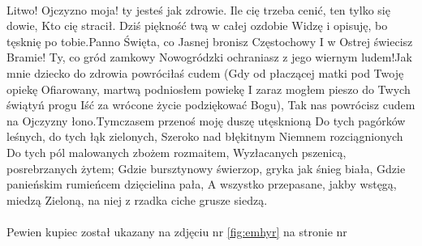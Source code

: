 \paragraph{}
Litwo! Ojczyzno moja! ty jesteś jak zdrowie. Ile cię trzeba cenić, ten tylko się dowie, Kto cię stracił. Dziś piękność twą w całej ozdobie Widzę i opisuję, bo tęsknię po tobie.Panno Święta, co Jasnej bronisz Częstochowy I w Ostrej świecisz Bramie! Ty, co gród zamkowy Nowogródzki ochraniasz z jego wiernym ludem!Jak mnie dziecko do zdrowia powróciłaś cudem (Gdy od płaczącej matki pod Twoję opiekę Ofiarowany, martwą podniosłem powiekę I zaraz mogłem pieszo do Twych świątyń progu Iść za wrócone życie podziękować Bogu), Tak nas powrócisz cudem na Ojczyzny łono.Tymczasem przenoś moję duszę utęsknioną Do tych pagórków leśnych, do tych łąk zielonych, Szeroko nad błękitnym Niemnem rozciągnionych Do tych pól malowanych zbożem rozmaitem, Wyzłacanych pszenicą, posrebrzanych żytem; Gdzie bursztynowy świerzop, gryka jak śnieg biała, Gdzie panieńskim rumieńcem dzięcielina pała, A wszystko przepasane, jakby wstęgą, miedzą Zieloną, na niej z rzadka ciche grusze siedzą.
\paragraph{}
Pewien kupiec został ukazany na zdjęciu nr \ref{fig:emhyr} na stronie nr \pageref{fig:emhyr}

